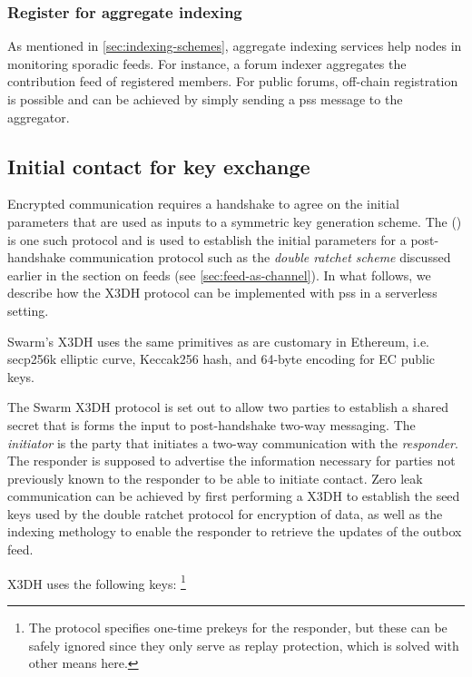 \subsubsection{Register for aggregate indexing}

As mentioned in \ref{sec:indexing-schemes}, aggregate indexing services help nodes in monitoring sporadic feeds. For instance, a forum indexer aggregates the contribution feed of registered members. For public forums, off-chain registration is possible and can be achieved by simply sending a pss message to the aggregator. 


\subsection{Initial contact for key exchange\statusgreen}\label{sec:pss-key-exchange}


Encrypted communication requires a handshake to agree on the initial parameters that are used as inputs to a symmetric key generation scheme. The  () is one such protocol \cite{marlinspike2016x3dh} and is used to establish the initial parameters for a post-handshake communication protocol such as the \emph{double ratchet scheme} discussed earlier in the section on feeds (see \ref{sec:feed-as-channel}). 
In what follows, we describe how the X3DH protocol can be implemented with pss in a serverless setting. 

Swarm's X3DH uses the same primitives as are customary in Ethereum, i.e. secp256k elliptic curve, Keccak256 hash, and 64-byte encoding for EC public keys. 

The Swarm X3DH protocol is set out to allow two parties to establish a shared secret that is forms the input to post-handshake two-way messaging. The \emph{initiator} is the party that initiates a two-way communication with the \emph{responder}. The responder is supposed to advertise the information necessary for parties not previously known to the responder to be able to initiate contact. Zero leak communication can be achieved by first performing a X3DH to establish the seed keys used by the double ratchet protocol for encryption of data, as well as the indexing methology to enable the responder to retrieve the updates of the outbox feed.

X3DH uses the following keys:%
%
\footnote{The protocol specifies one-time prekeys for the responder, but these can be safely ignored since they only serve as replay protection, which is solved with other means here.}

